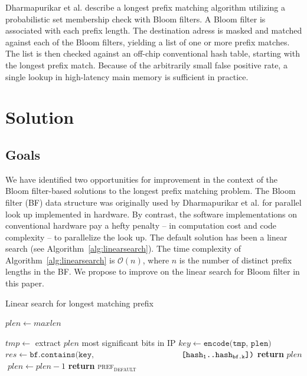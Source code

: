 \documentclass[conference,compsoc]{IEEEtran}
\begin{document}
Dharmapurikar et al.\cite{Dharmapurikar:Bloom} describe a longest prefix
matching algorithm utilizing a probabilistic set membership check with
Bloom filters. A Bloom filter is associated with each prefix length. The
destination adress is masked and matched against each of the Bloom filters,
yielding a list of one or more prefix matches. The list is then checked
against an off-chip conventional hash table, starting with the longest 
prefix match. Because of the arbitrarily small false positive rate, 
a single lookup in high-latency main memory is sufficient in practice.

\section{Solution}

\subsection{Goals}

We have identified two opportunities for improvement in the context of
the Bloom filter-based solutions to the longest prefix matching problem.
The Bloom filter (BF) data structure was originally used by 
Dharmapurikar et al. \cite{Dharmapurikar}
for parallel look up implemented in hardware. By contrast, the software
implementations on conventional hardware pay a hefty penalty -- in computation
cost and code complexity -- to parallelize the look up. The default solution
has been a linear search (see Algorithm~\ref{alg:linearsearch}). The time
complexity of Algorithm~\ref{alg:linearsearch} is $\mathcal{O}(n)$, where $n$
is the number of distinct prefix lengths in the BF. We
propose to improve on the linear search for Bloom filter in this paper.

\begin{algorithm}
\caption{Linear search for longest matching prefix}\label{alg:linearsearch}
\begin{algorithmic}[1]
\State $plen \gets maxlen$

  \State $tmp \gets$ extract $plen$ most significant bits in IP
  \State $key \gets \texttt{encode(tmp, plen)}$
  \State $res \gets \texttt{bf.contains(key,}$
                \State $\hspace*{36mm} \texttt{[hash\textsubscript{1}..hash\textsubscript{bf.k}])}$
      \State \textbf{return} $plen$
  \Else
    $\;plen \gets plen - 1$
  \EndIf
\EndWhile
\State \textbf{return} \textsc{pref\textsubscript{default}}
\EndProcedure
\end{algorithmic}
\end{algorithm}
\end{document}
